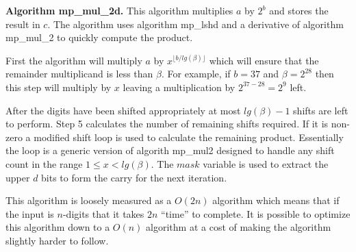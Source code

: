 \documentclass[b5paper]{book}
\begin{document}
\textbf{Algorithm mp\_mul\_2d.}
This algorithm multiplies $a$ by $2^b$ and stores the result in $c$.  The algorithm uses algorithm mp\_lshd and a derivative of algorithm mp\_mul\_2 to
quickly compute the product.

First the algorithm will multiply $a$ by $x^{\lfloor b / lg(\beta) \rfloor}$ which will ensure that the remainder multiplicand is less than 
$\beta$.  For example, if $b = 37$ and $\beta = 2^{28}$ then this step will multiply by $x$ leaving a multiplication by $2^{37 - 28} = 2^{9}$ 
left.

After the digits have been shifted appropriately at most $lg(\beta) - 1$ shifts are left to perform.  Step 5 calculates the number of remaining shifts 
required.  If it is non-zero a modified shift loop is used to calculate the remaining product.  
Essentially the loop is a generic version of algorith mp\_mul2 designed to handle any shift count in the range $1 \le x < lg(\beta)$.  The $mask$
variable is used to extract the upper $d$ bits to form the carry for the next iteration.  

This algorithm is loosely measured as a $O(2n)$ algorithm which means that if the input is $n$-digits that it takes $2n$ ``time'' to 
complete.  It is possible to optimize this algorithm down to a $O(n)$ algorithm at a cost of making the algorithm slightly harder to follow.
\end{document}

